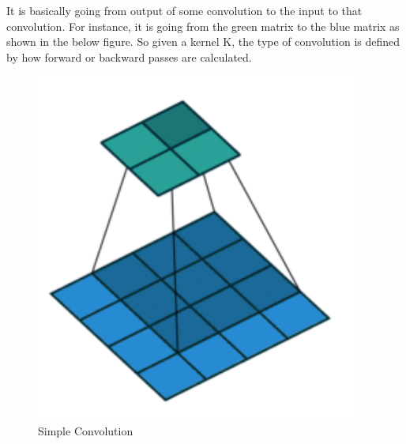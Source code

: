 \par
It is basically going from output of some convolution to the input to that convolution. For instance, it is going from the green matrix to the blue matrix as shown in the below figure. So given a kernel K, the type of convolution is defined by how forward or backward passes are calculated\cite{Deconv-Theano}.


\begin{figure}[ht]
  \centering
    \includegraphics[scale=.5, angle=0]{Files/simple-conv.png}
    \caption[Simple Convolution]{Simple Convolution \cite{Deconv-Theano}}
    \label{fig: Simple Convolution}
\end{figure}


